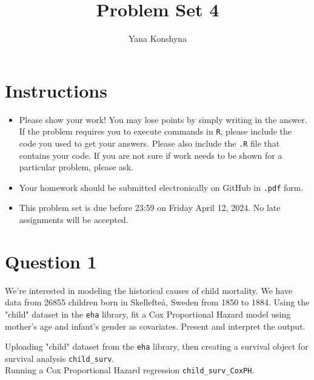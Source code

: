 \documentclass[12pt,letterpaper]{article}
\title{Problem Set 4}
\author{Yana Konshyna}
\begin{document}
	\maketitle
	\section*{Instructions}
	\begin{itemize}
	\item Please show your work! You may lose points by simply writing in the answer. If the problem requires you to execute commands in \texttt{R}, please include the code you used to get your answers. Please also include the \texttt{.R} file that contains your code. If you are not sure if work needs to be shown for a particular problem, please ask.
	\item Your homework should be submitted electronically on GitHub in \texttt{.pdf} form.
	\item This problem set is due before 23:59 on Friday April 12, 2024. No late assignments will be accepted.

	\end{itemize}

	\vspace{.25cm}
\section*{Question 1}
\vspace{.25cm}
\noindent We're interested in modeling the historical causes of child mortality. We have data from 26855 children born in Skellefteå, Sweden from 1850 to 1884. Using the "child" dataset in the \texttt{eha} library, fit a Cox Proportional Hazard model using mother's age and infant's gender as covariates. Present and interpret the output.

\vspace{1cm}
	\noindent  Uploading "child" dataset from the \texttt{eha} library, then creating a survival object for survival analysis \texttt{child\_surv}.  \\ Running a Cox Proportional Hazard regression \texttt{child\_surv\_CoxPH}. 
 

\vspace{.5cm}
\end{document}

